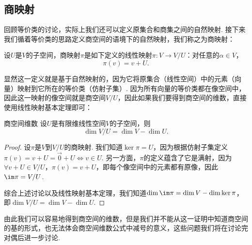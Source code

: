 \subsection{商映射}

回顾等价类的讨论，实际上我们还可以定义原集合和商集之间的自然映射. 接下来我们循着等价类的思路定义商空间的语境下的自然映射，我们称之为商映射：
\begin{definition}{}{}
    设$U$是$V$的子空间，商映射$\pi$是如下定义的线性映射$\pi:V\to V/U$：对任意的$\alpha\in V$，
    \[\pi(v)=v+U.\]
\end{definition}
显然这一定义就是基于自然映射的，因为它将原集合（线性空间）中的元素（向量）映射到它所在的等价类（仿射子集）. 因为所有向量的等价类都在像空间中，因此这一映射的像空间就是商空间$V/U$，因此如果我们要得到商空间的维数，直接使用线性映射基本定理即可：
\begin{theorem}{}{商空间维数}
    设$U$是有限维线性空间$V$的子空间，则
    \[\dim V/U=\dim V-\dim U.\]
\end{theorem}
\begin{proof}
    设$\pi$是$V$到$V/U$的商映射. 我们知道$\ker\pi=U$，因为根据仿射子集定义$\pi(v)=v+U=\vec{0}+U\iff v\in U$. 另一方面，$\pi$的定义蕴含了它是满射，因为$\forall v+U\in V/U$，$\pi(v)=v+U$，即每个像空间中的元素都有原像，因此$\im\pi=V/U$.

    综合上述讨论以及线性映射基本定理，我们知道$\dim\im\pi=\dim V-\dim\ker\pi$，即$\dim V/U=\dim V-\dim U$.
\end{proof}

由此我们可以容易地得到商空间的维数，但是我们并不能从这一证明中知道商空间的基的形式，也无法体会商空间维数公式中减号的意义，这些问题我们将在讨论完对偶后进一步讨论.




